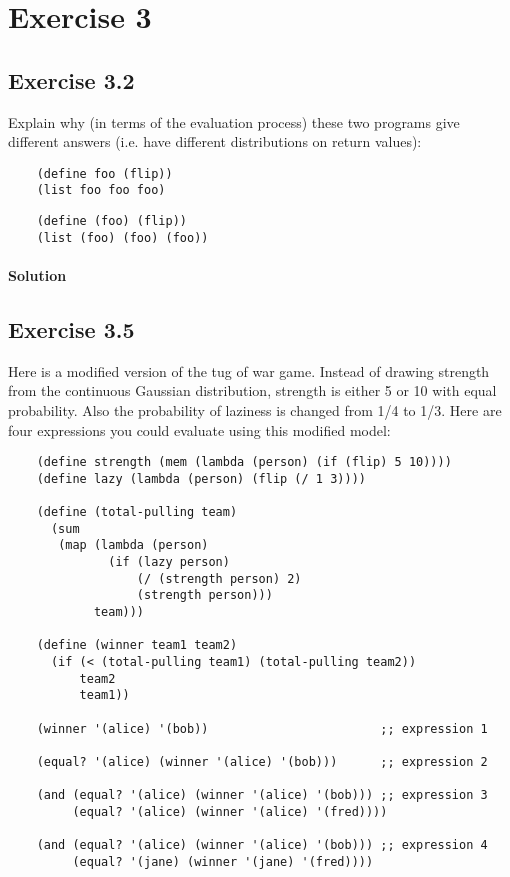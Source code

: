 \section*{Exercise 3}

\subsection*{Exercise 3.2}
Explain why (in terms of the evaluation process) these two programs give different answers 
(i.e. have different distributions on return values):
\begin{lstlisting}
    (define foo (flip))
    (list foo foo foo)
\end{lstlisting}

\begin{lstlisting}
    (define (foo) (flip))
    (list (foo) (foo) (foo))
\end{lstlisting}    

\paragraph{Solution}


\subsection*{Exercise 3.5}
Here is a modified version of the tug of war game. Instead of drawing strength from the continuous Gaussian 
distribution, strength is either 5 or 10 with equal probability. Also the probability of laziness is changed from 1/4 to 1/3. 
Here are four expressions you could evaluate using this modified model:

\begin{lstlisting}
    (define strength (mem (lambda (person) (if (flip) 5 10))))
    (define lazy (lambda (person) (flip (/ 1 3))))

    (define (total-pulling team)
      (sum
       (map (lambda (person)
              (if (lazy person)
                  (/ (strength person) 2) 
                  (strength person)))
            team)))

    (define (winner team1 team2) 
      (if (< (total-pulling team1) (total-pulling team2)) 
          team2 
          team1))

    (winner '(alice) '(bob))                        ;; expression 1

    (equal? '(alice) (winner '(alice) '(bob)))      ;; expression 2

    (and (equal? '(alice) (winner '(alice) '(bob))) ;; expression 3
         (equal? '(alice) (winner '(alice) '(fred))))

    (and (equal? '(alice) (winner '(alice) '(bob))) ;; expression 4
         (equal? '(jane) (winner '(jane) '(fred))))
\end{lstlisting}

